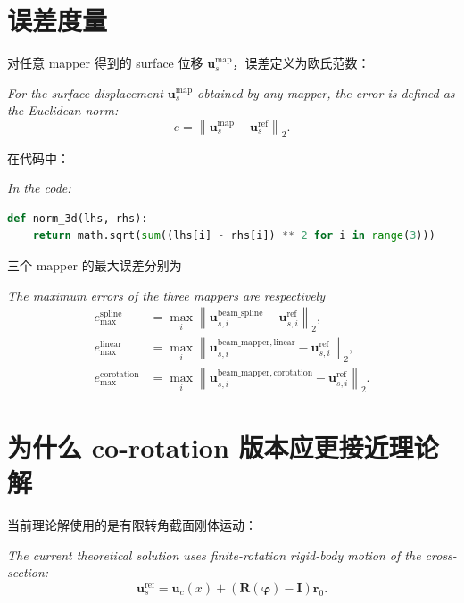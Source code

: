 \documentclass[UTF8,a4paper,11pt]{ctexart}
\begin{document}
\section{误差度量}

对任意 mapper 得到的 surface 位移 \(\bm{u}_s^{\mathrm{map}}\)，误差定义为欧氏范数：
\par\noindent\emph{For the surface displacement \(\bm{u}_s^{\mathrm{map}}\) obtained by any mapper, the error is defined as the Euclidean norm:}
\begin{equation}
  e =
  \left\|
    \bm{u}_s^{\mathrm{map}}
    -
    \bm{u}_s^{\mathrm{ref}}
  \right\|_2.
\end{equation}

在代码中：
\par\noindent\emph{In the code:}
\begin{lstlisting}[language=Python]
def norm_3d(lhs, rhs):
    return math.sqrt(sum((lhs[i] - rhs[i]) ** 2 for i in range(3)))
\end{lstlisting}

三个 mapper 的最大误差分别为
\par\noindent\emph{The maximum errors of the three mappers are respectively}
\begin{align}
  e_{\max}^{\mathrm{spline}}
  &=
  \max_i
  \left\|
    \bm{u}_{s,i}^{\mathrm{beam\_spline}}
    -
    \bm{u}_{s,i}^{\mathrm{ref}}
  \right\|_2, \\
  e_{\max}^{\mathrm{linear}}
  &=
  \max_i
  \left\|
    \bm{u}_{s,i}^{\mathrm{beam\_mapper,linear}}
    -
    \bm{u}_{s,i}^{\mathrm{ref}}
  \right\|_2, \\
  e_{\max}^{\mathrm{corotation}}
  &=
  \max_i
  \left\|
    \bm{u}_{s,i}^{\mathrm{beam\_mapper,corotation}}
    -
    \bm{u}_{s,i}^{\mathrm{ref}}
  \right\|_2.
\end{align}

\section{为什么 co-rotation 版本应更接近理论解}

当前理论解使用的是有限转角截面刚体运动：
\par\noindent\emph{The current theoretical solution uses finite-rotation rigid-body motion of the cross-section:}
\begin{equation}
  \bm{u}_s^{\mathrm{ref}}
  =
  \bm{u}_c(x)
  +
  \left(\bm{R}(\bm{\varphi})-\bm{I}\right)\bm{r}_0.
\end{equation}
\end{document}
